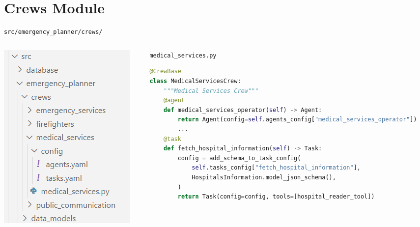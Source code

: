\section*{Crews Module}
\begin{frame}[fragile]{\texttt{src/emergency\_planner/crews/}}
    \begin{columns}[c]
      \begin{column}{0.3\textwidth}
          \includegraphics[width=\textwidth]{figures/crews_modules_folders.png}
      \end{column}
      \begin{column}{0.68\textwidth}
        \centering
        \texttt{medical\_services.py}
        \begin{lstlisting}[language=Python, breaklines=true]
@CrewBase
class MedicalServicesCrew:
    """Medical Services Crew"""
    @agent
    def medical_services_operator(self) -> Agent:
        return Agent(config=self.agents_config["medical_services_operator"])
        ...
    @task
    def fetch_hospital_information(self) -> Task:
        config = add_schema_to_task_config(
            self.tasks_config["fetch_hospital_information"],
            HospitalsInformation.model_json_schema(),
        )
        return Task(config=config, tools=[hospital_reader_tool])
        \end{lstlisting}
      \end{column}
    \end{columns}
\end{frame}